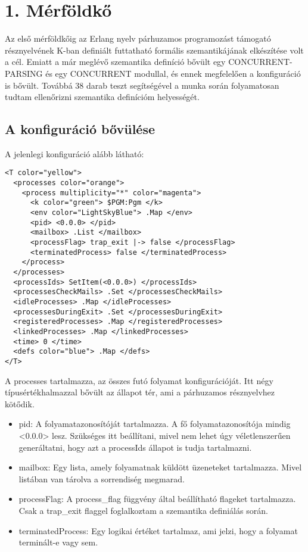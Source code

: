 \documentclass[]{article}
\begin{document}
\section*{1. Mérföldkő}
Az első mérföldkőig az Erlang nyelv párhuzamos programozást támogató résznyelvének K-ban definiált futtatható formális szemantikájának elkészítése volt a cél. Emiatt a már meglévő szemantika definíció bővült egy CONCURRENT-PARSING és egy CONCURRENT modullal, és ennek megfelelően a konfiguráció is bővült. Továbbá 38 darab teszt segítségével a munka során folyamatosan tudtam ellenőrizni szemantika definícióm helyességét.

\subsection*{A konfiguráció bővülése}
A jelenlegi konfiguráció alább látható:

\lstset{language=XML}
\begin{lstlisting}
<T color="yellow">
  <processes color="orange">
    <process multiplicity="*" color="magenta">
      <k color="green"> $PGM:Pgm </k>
      <env color="LightSkyBlue"> .Map </env>
      <pid> <0.0.0> </pid>
      <mailbox> .List </mailbox>
      <processFlag> trap_exit |-> false </processFlag>
      <terminatedProcess> false </terminatedProcess>
    </process>
  </processes>
  <processIds> SetItem(<0.0.0>) </processIds>
  <processesCheckMails> .Set </processesCheckMails>
  <idleProcesses> .Map </idleProcesses>
  <processesDuringExit> .Set </processesDuringExit>
  <registeredProcesses> .Map </registeredProcesses>
  <linkedProcesses> .Map </linkedProcesses>
  <time> 0 </time>
  <defs color="blue"> .Map </defs>
</T>
\end{lstlisting}

A processes tartalmazza, az összes futó folyamat konfigurációját. Itt négy típusértékhalmazzal bővült az állapot tér, ami a párhuzamos résznyelvhez kötődik.

\begin{itemize}
\item pid: A folyamatazonosítóját tartalmazza. A fő folyamatazonosítója mindig <0.0.0> lesz. Szükséges itt beállítani, mivel nem lehet úgy véletlenszerűen generáltatni, hogy azt a processIds állapot is tudja tartalmazni.
\item mailbox: Egy lista, amely folyamatnak küldött üzeneteket tartalmazza. Mivel listában van tárolva a sorrendiség megmarad.
\item processFlag: A process\_flag függvény által beállítható flageket tartalmazza. Csak a trap\_exit flaggel foglalkoztam a szemantika definiálás során.
\item terminatedProcess: Egy logikai értéket tartalmaz, ami jelzi, hogy a folyamat terminált-e vagy sem.
\end{itemize}
\end{document}
